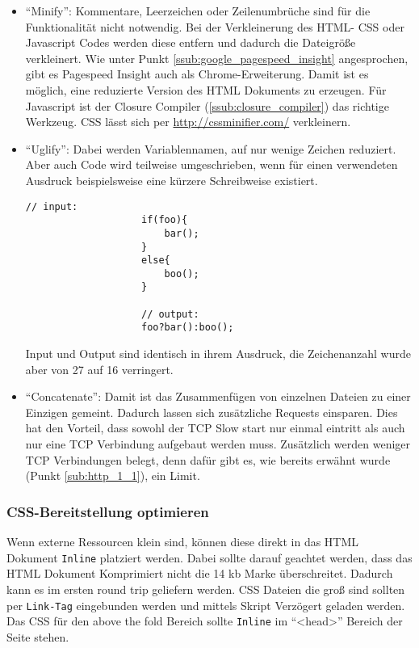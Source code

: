 				\begin{itemize}
					\item "`Minify"': Kommentare, Leerzeichen oder Zeilenumbrüche sind für die Funktionalität nicht notwendig. Bei der Verkleinerung des HTML- CSS oder Javascript Codes werden diese entfern und dadurch die Dateigröße verkleinert. Wie unter Punkt \ref{ssub:google_pagespeed_insight} angesprochen, gibt es Pagespeed Insight auch als Chrome-Erweiterung. Damit ist es möglich, eine reduzierte Version des HTML Dokuments zu erzeugen. Für Javascript ist der Closure Compiler (\ref{ssub:closure_compiler}) das richtige Werkzeug. CSS lässt sich per \url{http://cssminifier.com/} verkleinern.
					\item "`Uglify"': Dabei werden Variablennamen, auf nur wenige Zeichen reduziert. Aber auch Code wird teilweise umgeschrieben, wenn für einen verwendeten Ausdruck beispielsweise eine kürzere Schreibweise existiert.

					\begin{lstlisting}[captionpos=b, caption=Beispiel: Uglify eines Ausdrucks, label=lst:uglify]
					// input:
					if(foo){
						bar();
					}
					else{
						boo();
					}

					// output:
					foo?bar():boo();
					\end{lstlisting}

					Input und Output sind identisch in ihrem Ausdruck, die Zeichenanzahl wurde aber von 27 auf 16 verringert.

					\item "`Concatenate"': Damit ist das Zusammenfügen von einzelnen Dateien zu einer Einzigen gemeint. Dadurch lassen sich zusätzliche Requests einsparen. Dies hat den Vorteil, dass sowohl der TCP Slow start nur einmal eintritt als auch nur eine TCP Verbindung aufgebaut werden muss. Zusätzlich werden weniger TCP Verbindungen belegt, denn dafür gibt es, wie bereits erwähnt wurde (Punkt \ref{sub:http_1_1}), ein Limit.
				\end{itemize}

			\subsubsection{CSS-Bereitstellung optimieren} %
			\label{ssub:css_bereitstellung_optimieren}
				Wenn externe Ressourcen klein sind, können diese direkt in das HTML Dokument \texttt{Inline} platziert werden. Dabei sollte darauf geachtet werden, dass das HTML Dokument Komprimiert nicht die 14 kb Marke überschreitet. Dadurch kann es im ersten round trip geliefern werden. CSS Dateien die groß sind sollten per \texttt{Link-Tag} eingebunden werden und mittels Skript Verzögert geladen werden. Das CSS für den above the fold Bereich sollte \texttt{Inline} im "`<head>"' Bereich der Seite stehen. 

